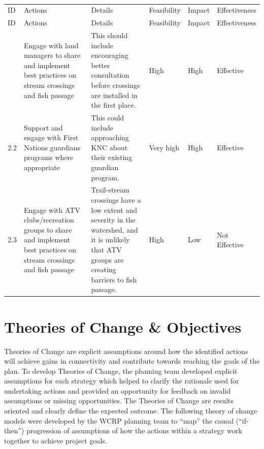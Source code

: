 \documentclass[
  letterpaper,
  DIV=11,
  numbers=noendperiod]{scrreprt}
\begin{document}

\begin{longtable}[]{@{}llllll@{}}

\caption{\label{tbl-S2}Strategy 2}

\tabularnewline

\caption{}\label{T_131c4}\tabularnewline
\toprule\noalign{}
ID & Actions & Details & Feasibility & Impact & Effectiveness \\
\midrule\noalign{}
\endfirsthead
\toprule\noalign{}
ID & Actions & Details & Feasibility & Impact & Effectiveness \\
\midrule\noalign{}
\endhead
\bottomrule\noalign{}
\endlastfoot
2.1 & Engage with land managers to share and implement best practices on
stream crossings and fish passage & This should include encouraging
better consultation before crossings are installed in the first place. &
High & High & Effective \\
2.2 & Support and engage with First Nations guardians programs where
appropriate & This could include approaching KNC about their existing
guardian program. & Very high & High & Effective \\
2.3 & Engage with ATV clubs/recreation groups to share and implement
best practices on stream crossings and fish passage & Trail-stream
crossings have a low extent and severity in the watershed, and it is
unlikely that ATV groups are creating barriers to fish passage. & High &
Low & Not Effective \\

\end{longtable}

\section*{Theories of Change \&
Objectives}\label{theories-of-change-objectives}


Theories of Change are explicit assumptions around how the identified
actions will achieve gains in connectivity and contribute towards
reaching the goals of the plan. To develop Theories of Change, the
planning team developed explicit assumptions for each strategy which
helped to clarify the rationale used for undertaking actions and
provided an opportunity for feedback on invalid assumptions or missing
opportunities. The Theories of Change are results oriented and clearly
define the expected outcome. The following theory of change models were
developed by the WCRP planning team to ``map'' the causal (``if-then'')
progression of assumptions of how the actions within a strategy work
together to achieve project goals.
\end{document}
